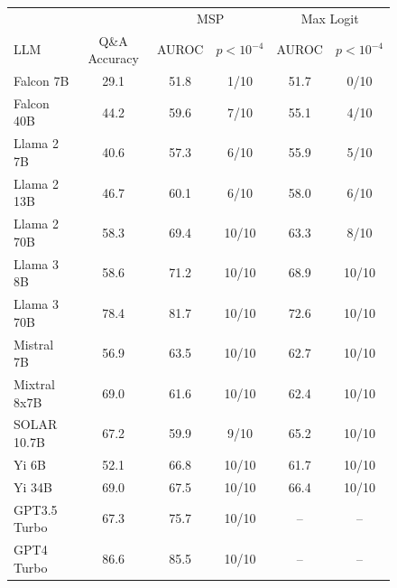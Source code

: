 \begin{figure}[h]
\small
\centering
{}
\label{tab:auroc}
\vspace{-.05 in}
\begin{tabular}{lccccc}
\toprule
& & \multicolumn{2}{c}{MSP} & \multicolumn{2}{c}{Max Logit} \\ 
LLM & Q\&A Accuracy & AUROC & $p < 10^{-4}$ & AUROC & $p < 10^{-4}$ \\ 
\cmidrule(lr){1-1} \cmidrule(lr){2-2} \cmidrule(lr){3-4} \cmidrule(lr){5-6} 
Falcon 7B & 29.1 & 51.8 & 1/10 & 51.7 & 0/10 \\
Falcon 40B & 44.2 & 59.6 & 7/10 & 55.1 & 4/10 \\
Llama 2 7B & 40.6 & 57.3 & 6/10 & 55.9 & 5/10 \\
Llama 2 13B & 46.7 & 60.1 & 6/10 & 58.0 & 6/10 \\
Llama 2 70B & 58.3 & 69.4 & 10/10 & 63.3 & 8/10 \\
Llama 3 8B & 58.6 & 71.2 & 10/10 & 68.9 & 10/10 \\
Llama 3 70B & 78.4 & 81.7 & 10/10 & 72.6 & 10/10 \\
Mistral 7B & 56.9 & 63.5 & 10/10 & 62.7 & 10/10 \\
Mixtral 8x7B & 69.0 & 61.6 & 10/10 & 62.4 & 10/10 \\
SOLAR 10.7B & 67.2 & 59.9 & 9/10 & 65.2 & 10/10 \\
Yi 6B & 52.1 & 66.8 & 10/10 & 61.7 & 10/10 \\
Yi 34B & 69.0 & 67.5 & 10/10 & 66.4 & 10/10 \\
GPT3.5 Turbo & 67.3 & 75.7 & 10/10 & -- & --\\
GPT4 Turbo & 86.6 & 85.5 & 10/10 & -- & --\\
\bottomrule
\end{tabular}


\end{figure}
